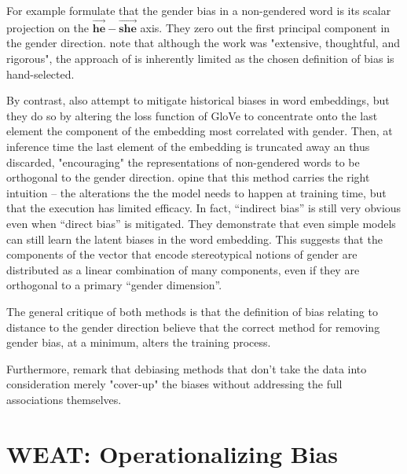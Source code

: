 \documentclass[11pt,a4paper]{article}
\begin{document}
For example \citet{bolukbasi2016man} formulate that the gender bias in a
non-gendered word is its scalar projection on the $\Vec{\textbf{he}} -
\Vec{\textbf{she}}$ axis. They zero out the first principal component in the
gender direction.  \citet{lipstick-1903-03862} note that although the work was
"extensive, thoughtful, and rigorous", the approach of \citet{bolukbasi2016man}
is inherently limited as the chosen definition of bias is hand-selected. 

By contrast, \citet{zhao2018learning} also attempt to mitigate historical biases
in word embeddings, but they do so by altering the loss function of GloVe to
concentrate onto the last element the component of the embedding most correlated
with gender. Then, at inference time the last element of the embedding is
truncated away an thus discarded, "encouraging" the representations of
non-gendered words to be orthogonal to the gender direction.
\citet{lipstick-1903-03862} opine that this method carries the right intuition
-- the alterations the the model needs to happen at training time, but that the
execution has limited efficacy. In fact, ``indirect bias'' is still very obvious
even when ``direct bias'' is mitigated. They demonstrate that even simple models
can still learn the latent biases in the word embedding. This suggests that the
components of the vector that encode stereotypical notions of gender are
distributed as a linear combination of many components, even if they are
orthogonal to a primary ``gender dimension''.


The general critique of both methods is that the definition of bias relating to
distance to the gender direction \citet{lipstick-1903-03862} believe that the
correct method for removing gender bias, at a minimum, alters the training
process.

Furthermore, \citet{lipstick-1903-03862} remark that debiasing methods that
don't take the data into consideration merely "cover-up" the biases without
addressing the full associations themselves. 

\section{WEAT: Operationalizing Bias}
\end{document}
